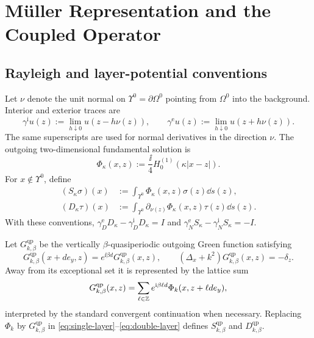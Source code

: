 \section{M\"uller Representation and the Coupled Operator}
\label{sec:muller-coupling}

\subsection{Rayleigh and layer-potential conventions}

Let $\nu$ denote the unit normal on $\Upsilon^0=\partial\Omega^0$ pointing from
$\Omega^0$ into the background.  Interior and exterior traces are
\[
  \gamma^{\mathrm i}u(z):=\lim_{h\downarrow0}u(z-h\nu(z)),
  \qquad
  \gamma^{\mathrm e}u(z):=\lim_{h\downarrow0}u(z+h\nu(z)).
\]
The same superscripts are used for normal derivatives in the direction $\nu$.
The outgoing two-dimensional fundamental solution is
\begin{equation}
  \Phi_\kappa(x,z):=\frac{\ii}{4}H_0^{(1)}(\kappa|x-z|).
  \label{eq:fundamental-solution}
\end{equation}
For $x\notin\Upsilon^0$, define
\begin{align}
  (S_\kappa\sigma)(x)&:=\int_{\Upsilon^0}\Phi_\kappa(x,z)\sigma(z)\dd s(z),
  \label{eq:single-layer}\\
  (D_\kappa\tau)(x)&:=\int_{\Upsilon^0}
  \partial_{\nu(z)}\Phi_\kappa(x,z)\tau(z)\dd s(z).
  \label{eq:double-layer}
\end{align}
With these conventions,
$\gamma_D^{\mathrm e}D_\kappa-\gamma_D^{\mathrm i}D_\kappa=I$ and
$\gamma_N^{\mathrm e}S_\kappa-\gamma_N^{\mathrm i}S_\kappa=-I$.

Let $G^{\mathrm{qp}}_{k,\beta}$ be the vertically $\beta$-quasiperiodic
outgoing Green function satisfying
\[
  G^{\mathrm{qp}}_{k,\beta}(x+de_y,z)
  =e^{\ii\beta d}G^{\mathrm{qp}}_{k,\beta}(x,z),
  \qquad (\Delta_x+k^2)G^{\mathrm{qp}}_{k,\beta}(x,z)=-\delta_z.
\]
Away from its exceptional set it is represented by the lattice sum
\begin{equation}
  G^{\mathrm{qp}}_{k,\beta}(x,z)
  =\sum_{\ell\in\mathbb{Z}}e^{\mathrm{i}\beta\ell d}
  \Phi_k(x,z+\ell d e_y),
  \label{eq:qp-Green}
\end{equation}
interpreted by the standard convergent continuation when necessary.  Replacing
$\Phi_k$ by $G^{\mathrm{qp}}_{k,\beta}$ in
\eqref{eq:single-layer}--\eqref{eq:double-layer} defines
$S^{\mathrm{qp}}_{k,\beta}$ and $D^{\mathrm{qp}}_{k,\beta}$.

